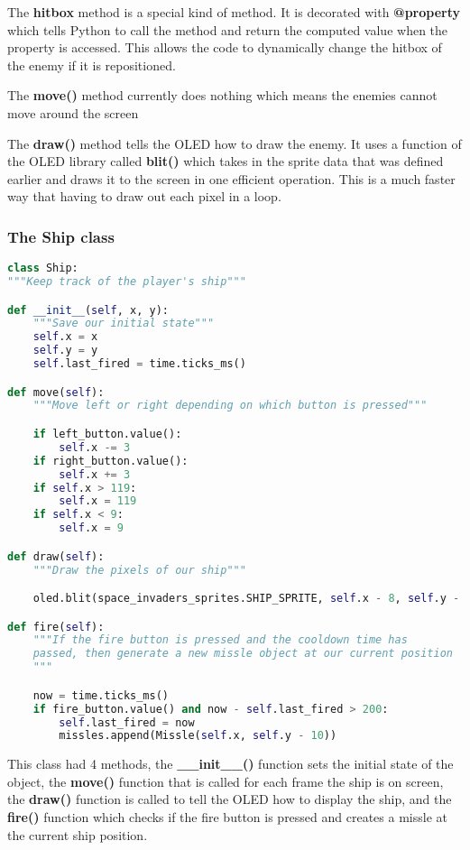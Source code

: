 The \textbf{hitbox} method is a special kind of method. It is decorated with \textbf{@property} which tells Python
to call the method and return the computed value when the property is accessed. This allows the code to dynamically
change the hitbox of the enemy if it is repositioned.

The \textbf{move()} method currently does nothing which means the enemies cannot move around the screen

The \textbf{draw()} method tells the OLED how to draw the enemy. It uses a function of the OLED library called \textbf{blit()}
which takes in the sprite data that was defined earlier and draws it to the screen in one efficient operation. This is a
much faster way that having to draw out each pixel in a loop.

\subsubsection{The Ship class}
\begin{lstlisting}[language=Python,caption=The Ship class]
class Ship:
"""Keep track of the player's ship"""

def __init__(self, x, y):
    """Save our initial state"""
    self.x = x
    self.y = y
    self.last_fired = time.ticks_ms()

def move(self):
    """Move left or right depending on which button is pressed"""

    if left_button.value():
        self.x -= 3
    if right_button.value():
        self.x += 3
    if self.x > 119:
        self.x = 119
    if self.x < 9:
        self.x = 9

def draw(self):
    """Draw the pixels of our ship"""

    oled.blit(space_invaders_sprites.SHIP_SPRITE, self.x - 8, self.y - 5)

def fire(self):
    """If the fire button is pressed and the cooldown time has
    passed, then generate a new missle object at our current position
    """

    now = time.ticks_ms()
    if fire_button.value() and now - self.last_fired > 200:
        self.last_fired = now
        missles.append(Missle(self.x, self.y - 10))
\end{lstlisting}

This class had 4 methods, the \textbf{\_\_init\_\_()} function sets the initial state of the object,
the \textbf{move()} function that is called for each frame the ship is on screen, the \textbf{draw()}
function is called to tell the OLED how to display the ship, and the \textbf{fire()} function which
checks if the fire button is pressed and creates a missle at the current ship position.

